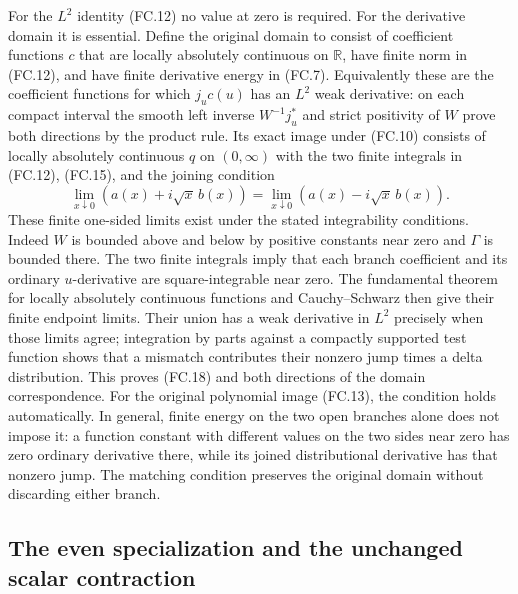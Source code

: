 For the \(L^2\) identity (FC.12) no value at zero is required.
For the derivative domain it is essential. Define the original domain
to consist of coefficient functions \(c\) that are locally absolutely
continuous on \(\mathbb R\), have finite norm in (FC.12), and have
finite derivative energy in (FC.7). Equivalently these are the
coefficient functions for which \(j_uc(u)\) has an \(L^2\) weak
derivative: on each compact interval the smooth left inverse
\(W^{-1}j_u^*\) and strict positivity of \(W\) prove both directions
by the product rule. Its exact image under (FC.10) consists of
locally absolutely continuous \(q\) on \((0,\infty)\) with the two
finite integrals in (FC.12), (FC.15), and the joining condition
\[
 \lim_{x\downarrow0}(a(x)+i\sqrt x\,b(x))
     =\lim_{x\downarrow0}(a(x)-i\sqrt x\,b(x)).
 \tag{FC.18}
\]
These finite one-sided limits exist under the stated integrability
conditions. Indeed \(W\) is bounded above and below by positive
constants near zero and \(\Gamma\) is bounded there. The two
finite integrals imply that each branch coefficient and its ordinary
\(u\)-derivative are square-integrable near zero. The fundamental
theorem for locally absolutely continuous functions and
Cauchy--Schwarz then give their finite endpoint limits. Their union
has a weak derivative in \(L^2\) precisely when those limits agree;
integration by parts against a compactly supported test function
shows that a mismatch contributes their nonzero jump times a delta
distribution. This proves (FC.18) and both directions of the
domain correspondence. For the original polynomial image (FC.13),
the condition holds automatically. In general, finite energy on the
two open branches alone does not impose it: a function constant with
different values on the two sides near zero has zero ordinary
derivative there, while its joined distributional derivative has
that nonzero jump. The matching condition preserves the original
domain without discarding either branch.

\subsection{The even specialization and the unchanged scalar contraction}

